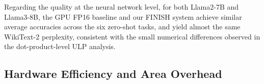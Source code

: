 \documentclass[sigconf,anonymous,nonacm]{acmart}
\newcommand{\ours}{\textsc{FINISH}}
\newcommand{\fpint}{FP-INT}
\begin{document}
Regarding the quality at the neural network level, for both Llama2-7B and Llama3-8B, the GPU FP16 baseline and our FINISH system achieve similar average accuracies across the six zero-shot tasks, and yield almost the same WikiText-2 perplexity, consistent with the small numerical differences observed in the dot-product-level ULP analysis.



\subsection{Hardware Efficiency and Area Overhead}
\label{sec:eval-hw-efficiency}


\end{document}
